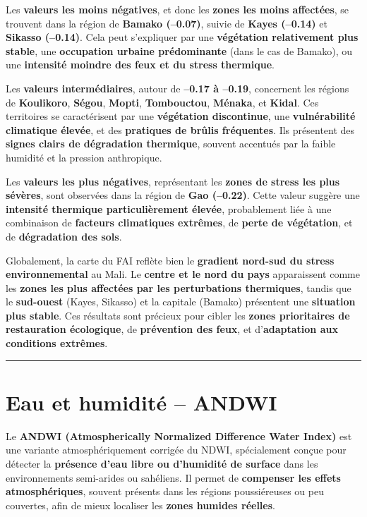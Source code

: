 \documentclass[
]{book}
\begin{document}
Les \textbf{valeurs les moins négatives}, et donc les \textbf{zones les moins affectées}, se trouvent dans la région de \textbf{Bamako (--0.07)}, suivie de \textbf{Kayes (--0.14)} et \textbf{Sikasso (--0.14)}. Cela peut s'expliquer par une \textbf{végétation relativement plus stable}, une \textbf{occupation urbaine prédominante} (dans le cas de Bamako), ou une \textbf{intensité moindre des feux et du stress thermique}.

Les \textbf{valeurs intermédiaires}, autour de \textbf{--0.17 à --0.19}, concernent les régions de \textbf{Koulikoro}, \textbf{Ségou}, \textbf{Mopti}, \textbf{Tombouctou}, \textbf{Ménaka}, et \textbf{Kidal}. Ces territoires se caractérisent par une \textbf{végétation discontinue}, une \textbf{vulnérabilité climatique élevée}, et des \textbf{pratiques de brûlis fréquentes}. Ils présentent des \textbf{signes clairs de dégradation thermique}, souvent accentués par la faible humidité et la pression anthropique.

Les \textbf{valeurs les plus négatives}, représentant les \textbf{zones de stress les plus sévères}, sont observées dans la région de \textbf{Gao (--0.22)}. Cette valeur suggère une \textbf{intensité thermique particulièrement élevée}, probablement liée à une combinaison de \textbf{facteurs climatiques extrêmes}, de \textbf{perte de végétation}, et de \textbf{dégradation des sols}.

Globalement, la carte du FAI reflète bien le \textbf{gradient nord-sud du stress environnemental} au Mali. Le \textbf{centre et le nord du pays} apparaissent comme les \textbf{zones les plus affectées par les perturbations thermiques}, tandis que le \textbf{sud-ouest} (Kayes, Sikasso) et la capitale (Bamako) présentent une \textbf{situation plus stable}. Ces résultats sont précieux pour cibler les \textbf{zones prioritaires de restauration écologique}, de \textbf{prévention des feux}, et d'\textbf{adaptation aux conditions extrêmes}.

\begin{center}\rule{0.5\linewidth}{0.5pt}\end{center}

\section{Eau et humidité -- ANDWI}\label{eau-et-humidituxe9-andwi}

Le \textbf{ANDWI (Atmospherically Normalized Difference Water Index)} est une variante atmosphériquement corrigée du NDWI, spécialement conçue pour détecter la \textbf{présence d'eau libre ou d'humidité de surface} dans les environnements semi-arides ou sahéliens. Il permet de \textbf{compenser les effets atmosphériques}, souvent présents dans les régions poussiéreuses ou peu couvertes, afin de mieux localiser les \textbf{zones humides réelles}.
\end{document}
